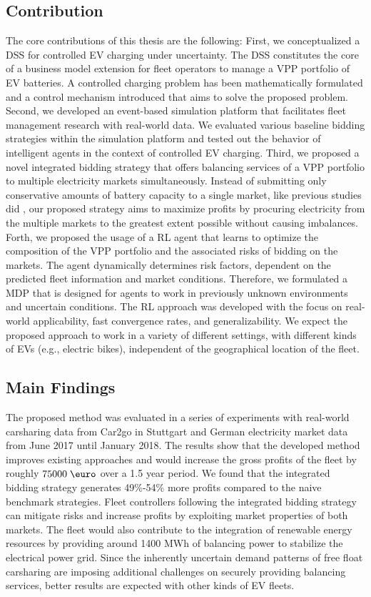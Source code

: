 \documentclass[a4paper, 12pt]{article}
\let\cite\shortcite
\begin{document}
\subsection{Contribution}
\label{sec:org246ec93}
The core contributions of this thesis are the following: First, we
conceptualized a DSS for controlled EV charging under uncertainty. The DSS
constitutes the core of a business model extension for fleet operators to manage
a VPP portfolio of EV batteries. A controlled charging problem has been
mathematically formulated and a control mechanism introduced that aims to solve
the proposed problem. Second, we developed an event-based simulation platform
that facilitates fleet management research with real-world data. We evaluated
various baseline bidding strategies within the simulation platform and tested
out the behavior of intelligent agents in the context of controlled EV charging.
Third, we proposed a novel integrated bidding strategy that offers balancing
services of a VPP portfolio to multiple electricity markets simultaneously.
Instead of submitting only conservative amounts of battery capacity to a single
market, like previous studies did
\cite{kahlen17_fleet,kahlen18_elect_vehic_virtual_power_plant_dilem}, our proposed
strategy aims to maximize profits by procuring electricity from the multiple
markets to the greatest extent possible without causing imbalances. Forth, we
proposed the usage of a RL agent that learns to optimize the composition of the
VPP portfolio and the associated risks of bidding on the markets. The agent
dynamically determines risk factors, dependent on the predicted fleet
information and market conditions. Therefore, we formulated a MDP that is
designed for agents to work in previously unknown environments and uncertain
conditions. The RL approach was developed with the focus on real-world
applicability, fast convergence rates, and generalizability. We expect the
proposed approach to work in a variety of different settings, with different
kinds of EVs (e.g., electric bikes), independent of the geographical location
of the fleet.

\subsection{Main Findings}
\label{sec:org388e274}
The proposed method was evaluated in a series of experiments with real-world
carsharing data from Car2go in Stuttgart and German electricity market data from
June 2017 until January 2018. The results show that the developed method
improves existing approaches and would increase the gross profits of the fleet
by roughly \(75 000\; \eur\) over a 1.5 year period. We found that the integrated
bidding strategy generates 49\%-54\% more profits compared to the naive benchmark
strategies. Fleet controllers following the integrated bidding strategy can
mitigate risks and increase profits by exploiting market properties of both
markets. The fleet would also contribute to the integration of renewable energy
resources by providing around 1400 MWh of balancing power to stabilize the
electrical power grid. Since the inherently uncertain demand patterns of free
float carsharing are imposing additional challenges on securely providing
balancing services, better results are expected with other kinds of EV fleets.
\end{document}
